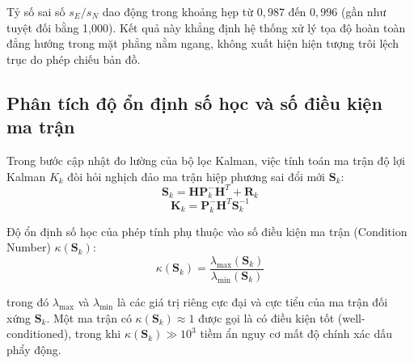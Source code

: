Tỷ số sai số $s_E / s_N$ dao động trong khoảng hẹp từ $0{,}987$ đến $0{,}996$ (gần như tuyệt đối bằng 1,000). Kết quả này khẳng định hệ thống xử lý tọa độ hoàn toàn đẳng hướng trong mặt phẳng nằm ngang, không xuất hiện hiện tượng trôi lệch trục do phép chiếu bản đồ.

\subsection{Phân tích độ ổn định số học và số điều kiện ma trận}

\hspace{0.5cm} Trong bước cập nhật đo lường của bộ lọc Kalman, việc tính toán ma trận độ lợi Kalman $K_k$ đòi hỏi nghịch đảo ma trận hiệp phương sai đổi mới $\mathbf{S}_k$:
\begin{equation}
\mathbf{S}_k = \mathbf{H} \mathbf{P}_k^- \mathbf{H}^T + \mathbf{R}_k
\label{eq:innovation-covariance}
\end{equation}
\begin{equation}
\mathbf{K}_k = \mathbf{P}_k^- \mathbf{H}^T \mathbf{S}_k^{-1}
\label{eq:kalman-gain-formula}
\end{equation}

Độ ổn định số học của phép tính phụ thuộc vào số điều kiện ma trận (Condition Number) $\kappa(\mathbf{S}_k)$:
\begin{equation}
\kappa(\mathbf{S}_k) = \frac{\lambda_{\max}(\mathbf{S}_k)}{\lambda_{\min}(\mathbf{S}_k)}
\label{eq:condition-number}
\end{equation}

trong đó $\lambda_{\max}$ và $\lambda_{\min}$ là các giá trị riêng cực đại và cực tiểu của ma trận đối xứng $\mathbf{S}_k$. Một ma trận có $\kappa(\mathbf{S}_k) \approx 1$ được gọi là có điều kiện tốt (well-conditioned), trong khi $\kappa(\mathbf{S}_k) \gg 10^3$ tiềm ẩn nguy cơ mất độ chính xác dấu phẩy động.

\begin{table}[H]
\centering
\caption{Khảo sát số điều kiện $\kappa(\mathbf{S}_k)$ của ma trận đổi mới trong suốt quá trình lọc}
\label{tab:matrix-conditioning}
\end{table}

